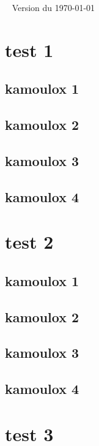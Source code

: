 \documentclass[12pt,a4paper]{book}
\begin{document}
	\setcounter{tocdepth}{1}
	\setcounter{secnumdepth}{3}
	\newpage
	\begin{flushright}
		~
		\vfill
		\vspace{200px}
		Version du \today{}
	\end{flushright}
	
	\thispagestyle{empty} 
	\frontmatter
	
	\tableofcontents
	\mainmatter
	\chapter{test 1}
	\section{kamoulox 1}
	\lipsum
	\section{kamoulox 2}
	\lipsum 
	\section{kamoulox 3}
	\lipsum 
	\section{kamoulox 4}
	\lipsum 

	\chapter{test 2}
	\section{kamoulox 1}
	\lipsum 
	\section{kamoulox 2}
	\lipsum 
	\section{kamoulox 3}
	\lipsum 
	\section{kamoulox 4}
	\lipsum 

	\chapter{test 3}
\end{document}
